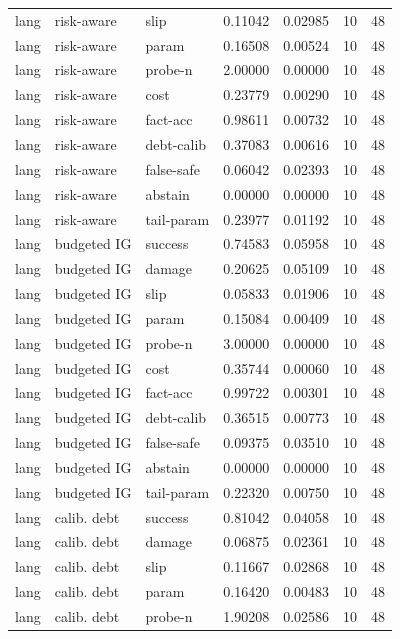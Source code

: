 \documentclass{article}
\begin{document}
\begin{center}
\begin{longtable}{lllllll}
lang & risk-aware & slip & 0.11042 & 0.02985 & 10 & 48 \\
lang & risk-aware & param & 0.16508 & 0.00524 & 10 & 48 \\
lang & risk-aware & probe-n & 2.00000 & 0.00000 & 10 & 48 \\
lang & risk-aware & cost & 0.23779 & 0.00290 & 10 & 48 \\
lang & risk-aware & fact-acc & 0.98611 & 0.00732 & 10 & 48 \\
lang & risk-aware & debt-calib & 0.37083 & 0.00616 & 10 & 48 \\
lang & risk-aware & false-safe & 0.06042 & 0.02393 & 10 & 48 \\
lang & risk-aware & abstain & 0.00000 & 0.00000 & 10 & 48 \\
lang & risk-aware & tail-param & 0.23977 & 0.01192 & 10 & 48 \\
lang & budgeted IG & success & 0.74583 & 0.05958 & 10 & 48 \\
lang & budgeted IG & damage & 0.20625 & 0.05109 & 10 & 48 \\
lang & budgeted IG & slip & 0.05833 & 0.01906 & 10 & 48 \\
lang & budgeted IG & param & 0.15084 & 0.00409 & 10 & 48 \\
lang & budgeted IG & probe-n & 3.00000 & 0.00000 & 10 & 48 \\
lang & budgeted IG & cost & 0.35744 & 0.00060 & 10 & 48 \\
lang & budgeted IG & fact-acc & 0.99722 & 0.00301 & 10 & 48 \\
lang & budgeted IG & debt-calib & 0.36515 & 0.00773 & 10 & 48 \\
lang & budgeted IG & false-safe & 0.09375 & 0.03510 & 10 & 48 \\
lang & budgeted IG & abstain & 0.00000 & 0.00000 & 10 & 48 \\
lang & budgeted IG & tail-param & 0.22320 & 0.00750 & 10 & 48 \\
lang & calib. debt & success & 0.81042 & 0.04058 & 10 & 48 \\
lang & calib. debt & damage & 0.06875 & 0.02361 & 10 & 48 \\
lang & calib. debt & slip & 0.11667 & 0.02868 & 10 & 48 \\
lang & calib. debt & param & 0.16420 & 0.00483 & 10 & 48 \\
lang & calib. debt & probe-n & 1.90208 & 0.02586 & 10 & 48 \\
\bottomrule
\end{longtable}
\renewcommand{\arraystretch}{1.0}
\end{center}
\end{document}
